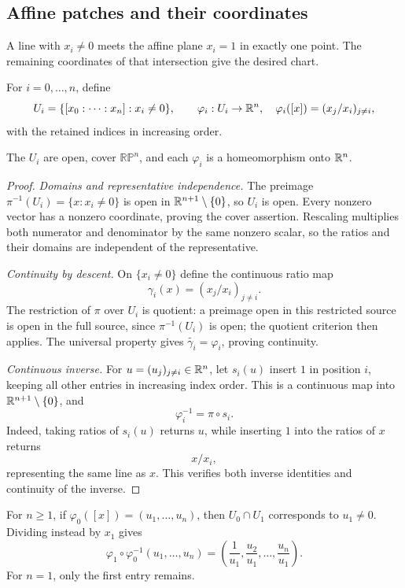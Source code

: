 \subsection{Affine patches and their coordinates}
A line with $x_i\ne0$ meets the affine plane $x_i=1$ in exactly one point.
The remaining coordinates of that intersection give the desired chart.
\begin{definition}
For $i=0,\ldots,n$, define
\[
U_i=\{[x_0:\cdots:x_n]:x_i\ne0\},\qquad
\varphi_i:U_i\to\mathbb{R}^n,\quad \varphi_i([x])=(x_j/x_i)_{j\ne i},
\]
with the retained indices in increasing order.
\end{definition}
\begin{proposition}
The $U_i$ are open, cover $\mathbb{RP}^n$, and each $\varphi_i$ is a
homeomorphism onto $\mathbb{R}^n$.
\end{proposition}
\begin{proof}
\emph{Domains and representative independence.}
The preimage $\pi^{-1}(U_i)=\{x:x_i\ne0\}$ is open in
$\mathbb{R}^{n+1}\setminus\{0\}$, so $U_i$ is open. Every nonzero vector has
a nonzero coordinate, proving the cover assertion. Rescaling multiplies
both numerator and denominator by the same nonzero scalar, so the ratios
and their domains are independent of the representative.

\emph{Continuity by descent.} On $\{x_i\ne0\}$ define the continuous
ratio map
\[
\gamma_i(x)=(x_j/x_i)_{j\ne i}.
\]
 The restriction of $\pi$
over $U_i$ is quotient: a preimage open in this restricted source is open
in the full source, since $\pi^{-1}(U_i)$ is open; the quotient criterion
then applies. The universal property gives
$\widetilde{\gamma_i}=\varphi_i$, proving continuity.

\emph{Continuous inverse.} For $u=(u_j)_{j\ne i}\in\mathbb{R}^n$, let $s_i(u)$
insert $1$ in position $i$, keeping all other entries in increasing index
order. This is a continuous map into $\mathbb{R}^{n+1}\setminus\{0\}$, and
\[
\varphi_i^{-1}=\pi\circ s_i.
\]
Indeed, taking ratios of $s_i(u)$ returns $u$, while inserting $1$ into
the ratios of $x$ returns
\[
x/x_i,
\]
 representing the same line as $x$.
This verifies both inverse identities and continuity of the inverse.
\end{proof}

\begin{example}
For $n\geq1$, if $\varphi_0([x])=(u_1,\ldots,u_n)$, then $U_0\cap U_1$
corresponds to $u_1\ne0$. Dividing instead by $x_1$ gives
\[
\varphi_1\circ\varphi_0^{-1}(u_1,\ldots,u_n)
=\left(\frac1{u_1},\frac{u_2}{u_1},\ldots,\frac{u_n}{u_1}\right).
\]
For $n=1$, only the first entry remains.
\end{example}
